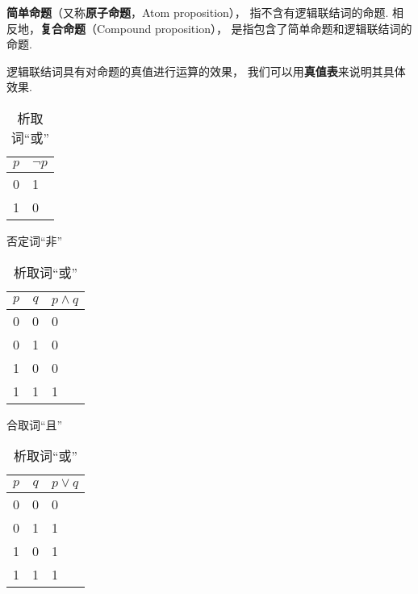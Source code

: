 \begin{definition}
\textbf{简单命题}（又称\textbf{原子命题}，Atom proposition），%
指不含有逻辑联结词的命题.
相反地，\textbf{复合命题}（Compound proposition），%
是指包含了简单命题和逻辑联结词的命题.

逻辑联结词具有对命题的真值进行运算的效果，%
我们可以用\textbf{真值表}来说明其具体效果.
\end{definition}

\begin{table}[ht]
\centering
\begin{subtable}[ht]{0.9\textwidth}
\centering
\begin{tabular}{|c|p{1.5cm}|}
\hline
\(p\) & \(\neg p\) \\ \hline
0 & 1 \\ \hline
1 & 0 \\ \hline
\end{tabular}
\caption{否定词“非”}
\end{subtable}

\begin{subtable}[ht]{0.45\textwidth}
\centering
\begin{tabular}{|*{2}{c|}p{2cm}|}
\hline
\(p\) & \(q\) & \(p \land q\) \\ \hline
0 & 0 & 0 \\ \hline
0 & 1 & 0 \\ \hline
1 & 0 & 0 \\ \hline
1 & 1 & 1 \\ \hline
\end{tabular}
\caption{合取词“且”}
\end{subtable}
\begin{subtable}[ht]{0.45\textwidth}
\centering
\begin{tabular}{|*{2}{c|}p{2cm}|}
\hline
\(p\) & \(q\) & \(p \lor q\) \\ \hline
0 & 0 & 0 \\ \hline
0 & 1 & 1 \\ \hline
1 & 0 & 1 \\ \hline
1 & 1 & 1 \\ \hline
\end{tabular}
\caption{析取词“或”}
\end{subtable}


\end{table}
